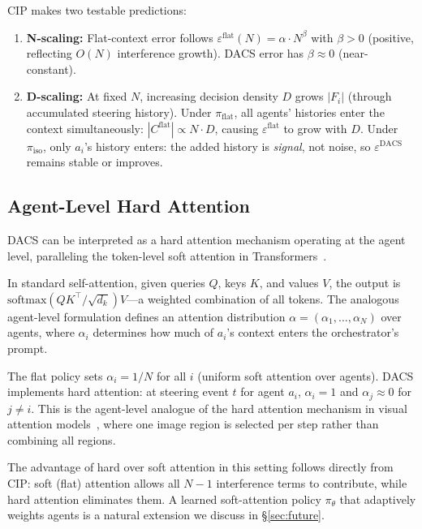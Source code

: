 \documentclass{article}
\begin{document}
CIP makes two testable predictions:

\begin{enumerate}
  \item \textbf{N-scaling:} Flat-context error follows
  $\varepsilon^{\text{flat}}(N) = \alpha \cdot N^{\beta}$ with
  $\beta > 0$ (positive, reflecting $O(N)$ interference growth).
  DACS error has $\beta \approx 0$ (near-constant).

  \item \textbf{D-scaling:} At fixed $N$, increasing decision density
  $D$ grows $|F_i|$ (through accumulated steering history).
  Under $\pi_{\text{flat}}$, all agents' histories enter the context
  simultaneously:
  $|C^{\text{flat}}| \propto N \cdot D$, causing
  $\varepsilon^{\text{flat}}$ to grow with $D$.
  Under $\pi_{\text{iso}}$, only $a_i$'s history enters:
  the added history is \emph{signal}, not noise, so
  $\varepsilon^{\text{DACS}}$ remains stable or improves.
\end{enumerate}

\subsection{Agent-Level Hard Attention}
\label{sec:hard_attn}

DACS can be interpreted as a hard attention mechanism operating at the
agent level, paralleling the token-level soft attention in
Transformers~\citep{vaswani2017attention}.

In standard self-attention, given queries $Q$, keys $K$, and values $V$,
the output is $\text{softmax}(QK^\top / \sqrt{d_k})V$---a weighted
combination of all tokens.
The analogous agent-level formulation defines an attention distribution
$\alpha = (\alpha_1, \ldots, \alpha_N)$ over agents,
where $\alpha_i$ determines how much of $a_i$'s context enters the
orchestrator's prompt.

The flat policy sets $\alpha_i = 1/N$ for all $i$ (uniform soft
attention over agents).
DACS implements hard attention:
at steering event $t$ for agent $a_i$,
$\alpha_i = 1$ and $\alpha_j \approx 0$ for $j \neq i$.
This is the agent-level analogue of the hard attention mechanism
in visual attention models~\citep{xu2015show}, where one image region
is selected per step rather than combining all regions.

The advantage of hard over soft attention in this setting follows
directly from CIP: soft (flat) attention allows all $N-1$ interference
terms to contribute, while hard attention eliminates them.
A learned soft-attention policy $\pi_\theta$ that adaptively weights
agents is a natural extension we discuss in \S\ref{sec:future}.
\end{document}

